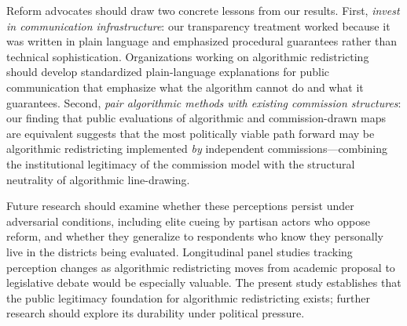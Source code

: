 Reform advocates should draw two concrete lessons from our results. First, \textit{invest in communication infrastructure}: our transparency treatment worked because it was written in plain language and emphasized procedural guarantees rather than technical sophistication. Organizations working on algorithmic redistricting should develop standardized plain-language explanations for public communication that emphasize what the algorithm cannot do and what it guarantees. Second, \textit{pair algorithmic methods with existing commission structures}: our finding that public evaluations of algorithmic and commission-drawn maps are equivalent suggests that the most politically viable path forward may be algorithmic redistricting implemented \textit{by} independent commissions---combining the institutional legitimacy of the commission model with the structural neutrality of algorithmic line-drawing.

Future research should examine whether these perceptions persist under adversarial conditions, including elite cueing by partisan actors who oppose reform, and whether they generalize to respondents who know they personally live in the districts being evaluated. Longitudinal panel studies tracking perception changes as algorithmic redistricting moves from academic proposal to legislative debate would be especially valuable. The present study establishes that the public legitimacy foundation for algorithmic redistricting exists; further research should explore its durability under political pressure.
